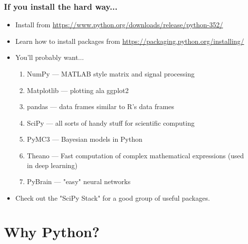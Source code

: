 \documentclass{beamer}
\begin{document}
\begin{frame}
\frametitle{If you install the hard way...}

\begin{itemize}
	\item Install from \url{https://www.python.org/downloads/release/python-352/}

	\item Learn how to install packages from \url{https://packaging.python.org/installing/}

	\item You'll probably want...

		\begin{enumerate}
		\item NumPy --- MATLAB style matrix and signal processing

		\item Matplotlib --- plotting ala ggplot2

		\item pandas --- data frames similar to R's data frames

		\item SciPy --- all sorts of handy stuff for scientific computing

		\item PyMC3 --- Bayesian models in Python

		\item Theano --- Fast computation of complex mathematical expressions (used in deep learning)

		\item PyBrain --- "easy" neural networks

	\end{enumerate}
	\item Check out the "SciPy Stack" for a good group of useful packages.

\end{itemize}

\end{frame}

\section{Why Python?}
\end{document}
